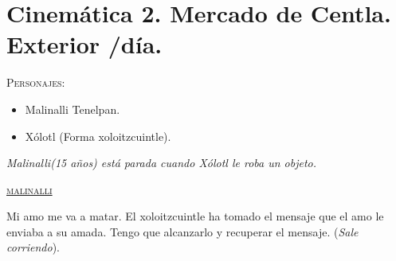 \section{Cinemática 2. Mercado de Centla. Exterior /día.} \label{Cin:Cinematica02}
\textsc{Personajes}:
\begin{itemize}
	\item Malinalli Tenelpan.
	\item Xólotl (Forma xoloitzcuintle).
\end{itemize}

\textit{Malinalli(15 años) está parada cuando Xólotl le roba un objeto.}
\begin{center}
\textsc{\underline{malinalli}}
\\
\par
Mi amo me va a matar. El xoloitzcuintle ha tomado el mensaje que el amo le enviaba a su amada. Tengo que alcanzarlo y recuperar el mensaje. (\textit{Sale corriendo}).
\end{center}
